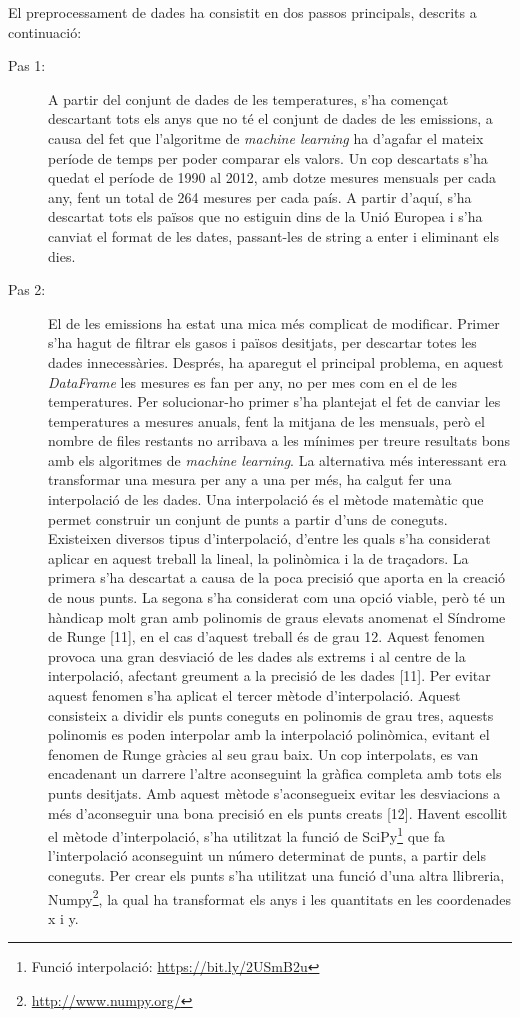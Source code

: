 \documentclass[10pt,a4paper,twocolumn,twoside]{article}
\begin{document}
El preprocessament de dades ha consistit en dos passos principals, descrits a continuació:
\begin{description}
\item[Pas 1:] A partir del conjunt de dades de les temperatures, s'ha començat descartant tots els anys que no té el conjunt de dades de les emissions, a causa del fet que l'algoritme de  \textit{machine learning} ha d'agafar el mateix període de temps per poder comparar els valors. Un cop descartats s'ha quedat el període de 1990 al 2012, amb dotze mesures mensuals per cada any, fent un total de 264 mesures per cada país. A partir d'aquí, s'ha descartat tots els països que no estiguin dins de la Unió Europea i s'ha canviat el format de les dates, passant-les de string a enter i eliminant els dies.
\item[Pas 2:]  El de les emissions ha estat una mica més complicat de modificar. Primer s'ha hagut de filtrar els gasos i països desitjats, per descartar totes les dades innecessàries. Després, ha aparegut el principal problema, en aquest \textit{DataFrame} les mesures es fan per any, no per mes com en el de les temperatures. Per solucionar-ho primer s'ha plantejat el fet de canviar les temperatures a mesures anuals, fent la mitjana de les mensuals, però el nombre de files restants no arribava a les mínimes per treure resultats bons amb els algoritmes de \textit{machine learning}. La alternativa més interessant era transformar una mesura per any a una per més, ha calgut fer una interpolació de les dades.
Una interpolació és el mètode matemàtic que permet construir un conjunt de punts a partir d'uns de coneguts. Existeixen diversos tipus d'interpolació, d'entre les quals s'ha considerat aplicar en aquest treball la lineal, la polinòmica i la de traçadors. La primera s'ha descartat a causa de la poca precisió que aporta en la creació de nous punts. La segona s'ha considerat com una opció viable, però té un hàndicap molt gran amb polinomis de graus elevats anomenat el Síndrome de Runge [11], en el cas d'aquest treball és de grau 12. Aquest fenomen provoca una gran desviació de les dades als extrems i al centre de la interpolació, afectant greument a la precisió de les dades [11]. Per evitar aquest fenomen s'ha aplicat el tercer mètode d'interpolació. Aquest consisteix a dividir els punts coneguts en polinomis de grau tres, aquests polinomis es poden interpolar amb la interpolació polinòmica, evitant el fenomen de Runge gràcies al seu grau baix. Un cop interpolats, es van encadenant un darrere l'altre aconseguint la gràfica completa amb tots els punts desitjats. Amb aquest mètode s'aconsegueix evitar les desviacions a més d'aconseguir una bona precisió en els punts creats [12]. Havent escollit el mètode d'interpolació, s'ha utilitzat la funció de SciPy\footnote{Funció interpolació: \url{https://bit.ly/2USmB2u}} que fa l'interpolació aconseguint un número determinat de punts, a partir dels coneguts. Per crear els punts s'ha utilitzat una funció d'una altra llibreria, Numpy\footnote{\url{http://www.numpy.org/}}, la qual ha transformat els anys i les quantitats en les coordenades x i y.
\end{description}
\end{document}
